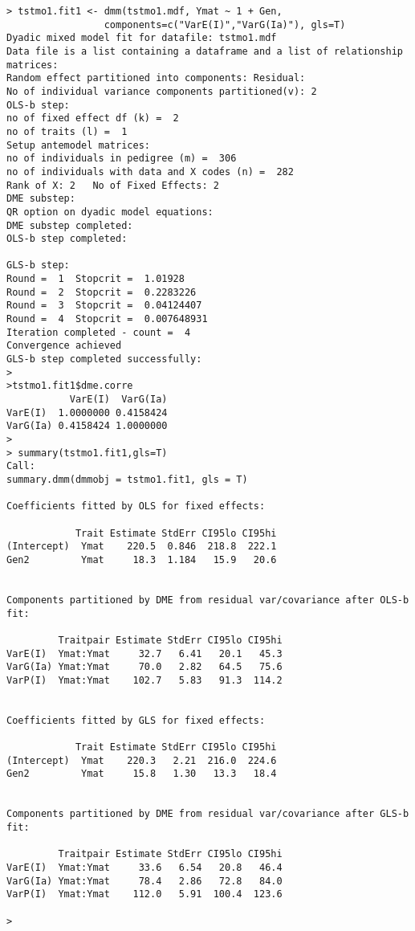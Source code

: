 \documentclass[titlepage]{article}  %
\begin{document}
\begin{verbatim}
> tstmo1.fit1 <- dmm(tstmo1.mdf, Ymat ~ 1 + Gen,
                 components=c("VarE(I)","VarG(Ia)"), gls=T)
Dyadic mixed model fit for datafile: tstmo1.mdf  
Data file is a list containing a dataframe and a list of relationship matrices:
Random effect partitioned into components: Residual:
No of individual variance components partitioned(v): 2 
OLS-b step:
no of fixed effect df (k) =  2 
no of traits (l) =  1 
Setup antemodel matrices:
no of individuals in pedigree (m) =  306 
no of individuals with data and X codes (n) =  282 
Rank of X: 2   No of Fixed Effects: 2 
DME substep:
QR option on dyadic model equations:
DME substep completed:
OLS-b step completed:

GLS-b step:
Round =  1  Stopcrit =  1.01928 
Round =  2  Stopcrit =  0.2283226 
Round =  3  Stopcrit =  0.04124407 
Round =  4  Stopcrit =  0.007648931 
Iteration completed - count =  4 
Convergence achieved
GLS-b step completed successfully:
>
>tstmo1.fit1$dme.corre
           VarE(I)  VarG(Ia)
VarE(I)  1.0000000 0.4158424
VarG(Ia) 0.4158424 1.0000000
>
> summary(tstmo1.fit1,gls=T)
Call:
summary.dmm(dmmobj = tstmo1.fit1, gls = T)

Coefficients fitted by OLS for fixed effects:

            Trait Estimate StdErr CI95lo CI95hi
(Intercept)  Ymat    220.5  0.846  218.8  222.1
Gen2         Ymat     18.3  1.184   15.9   20.6


Components partitioned by DME from residual var/covariance after OLS-b fit:

         Traitpair Estimate StdErr CI95lo CI95hi
VarE(I)  Ymat:Ymat     32.7   6.41   20.1   45.3
VarG(Ia) Ymat:Ymat     70.0   2.82   64.5   75.6
VarP(I)  Ymat:Ymat    102.7   5.83   91.3  114.2


Coefficients fitted by GLS for fixed effects:

            Trait Estimate StdErr CI95lo CI95hi
(Intercept)  Ymat    220.3   2.21  216.0  224.6
Gen2         Ymat     15.8   1.30   13.3   18.4


Components partitioned by DME from residual var/covariance after GLS-b fit:

         Traitpair Estimate StdErr CI95lo CI95hi
VarE(I)  Ymat:Ymat     33.6   6.54   20.8   46.4
VarG(Ia) Ymat:Ymat     78.4   2.86   72.8   84.0
VarP(I)  Ymat:Ymat    112.0   5.91  100.4  123.6

>
\end{verbatim}
\end{document}

